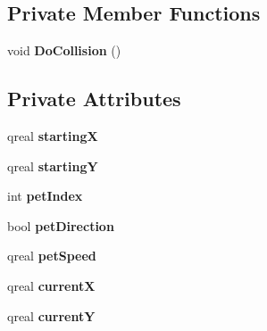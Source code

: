 \subsection*{Private Member Functions}
\begin{DoxyCompactItemize}
\item 
\hypertarget{classpet_af862a4c5e230b358529658e5f9f8615f}{void {\bfseries Do\-Collision} ()}\label{classpet_af862a4c5e230b358529658e5f9f8615f}

\end{DoxyCompactItemize}
\subsection*{Private Attributes}
\begin{DoxyCompactItemize}
\item 
\hypertarget{classpet_a6caa4fe31afe7bcb5325d4568f759e51}{qreal {\bfseries starting\-X}}\label{classpet_a6caa4fe31afe7bcb5325d4568f759e51}

\item 
\hypertarget{classpet_a7aaa8ceec60a3c04c7b3a5c14ebbcd7e}{qreal {\bfseries starting\-Y}}\label{classpet_a7aaa8ceec60a3c04c7b3a5c14ebbcd7e}

\item 
\hypertarget{classpet_a12503937d75d4f86c193251e9c5cd936}{int {\bfseries pet\-Index}}\label{classpet_a12503937d75d4f86c193251e9c5cd936}

\item 
\hypertarget{classpet_a5a874646b211cb361c2e8587d20b87e3}{bool {\bfseries pet\-Direction}}\label{classpet_a5a874646b211cb361c2e8587d20b87e3}

\item 
\hypertarget{classpet_a34b1e23d9bd15d5e319ddfc25f38ad11}{qreal {\bfseries pet\-Speed}}\label{classpet_a34b1e23d9bd15d5e319ddfc25f38ad11}

\item 
\hypertarget{classpet_ab48808361b8fcfeab472b1ec53947251}{qreal {\bfseries current\-X}}\label{classpet_ab48808361b8fcfeab472b1ec53947251}

\item 
\hypertarget{classpet_a9d132e9951b726aa8f24847fe54c7451}{qreal {\bfseries current\-Y}}\label{classpet_a9d132e9951b726aa8f24847fe54c7451}

\end{DoxyCompactItemize}


